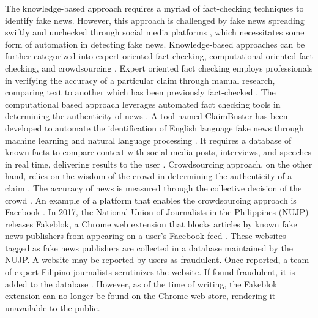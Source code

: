 The knowledge-based approach requires a myriad of fact-checking techniques to identify fake news. However, this approach is challenged by fake news spreading swiftly and unchecked through social media platforms \cite{qazvinian2011rumor}, which necessitates some form of automation in detecting fake news. Knowledge-based approaches can be further categorized into expert oriented fact checking, computational oriented fact checking, and crowdsourcing \cite{debeer2020approaches}. Expert oriented fact checking employs professionals in verifying the accuracy of a particular claim through manual research, comparing text to another which has been previously fact-checked \cite{vlachos2014factchecking}. The computational based approach leverages automated fact checking tools in determining the authenticity of news \cite{ahmed2019combining}. A tool named ClaimBuster \cite{claimbuster, hassan2017proposal} has been developed to automate the identification of English language fake news through machine learning and natural language processing \cite{hassan2017toward}. It requires a database of known facts to compare context with social media posts, interviews, and speeches in real time, delivering results to the user \cite{hassan2017toward}. Crowdsourcing approach, on the other hand, relies on the wisdom of the crowd in determining the authenticity of a claim \cite{ahmed2019combining}. The accuracy of news is measured through the collective decision of the crowd \cite{pennycook2019fighting}. An example of a platform that enables the crowdsourcing approach is Facebook \cite{tschiatschek2017detecting}. In 2017, the National Union of Journalists in the Philippines (NUJP) releases Fakeblok, a Chrome web extension that blocks articles by known fake news publishers from appearing on a user's Facebook feed \cite{inquirer-fakeblok, rappler-fakeblok}. These websites tagged as fake news publishers are collected in a database maintained by the NUJP. A website may be reported by users as fraudulent. Once reported, a team of expert Filipino journalists scrutinizes the website. If found fraudulent, it is added to the database \cite{cdi-fakeblok}. However, as of the time of writing, the Fakeblok extension can no longer be found on the Chrome web store, rendering it unavailable to the public.

